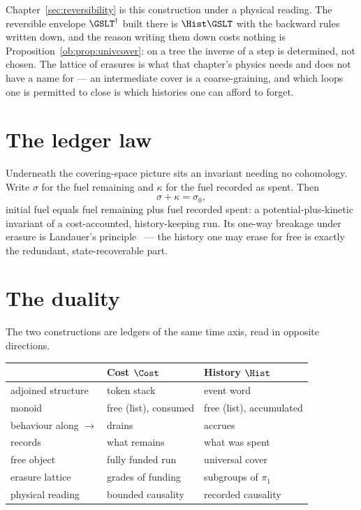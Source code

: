 \begin{remark}
\label{ob:rem:hist-forward}
Chapter~\ref{sec:reversibility} is this construction under a physical reading.
The reversible envelope $\GSLT^\dagger$ built there is $\Hist\GSLT$ with the
backward rules written down, and the reason writing them down costs nothing is
Proposition~\ref{ob:prop:univcover}: on a tree the inverse of a step is
determined, not chosen.
The lattice of erasures is what that chapter's physics needs and does not have a
name for --- an intermediate cover is a coarse-graining, and which loops one is
permitted to close is which histories one can afford to forget.
\end{remark}

\section{The ledger law}

Underneath the covering-space picture sits an invariant needing no cohomology. Write
$\sigma$ for the fuel remaining and $\kappa$ for the fuel recorded as spent. Then
\[
  \sigma + \kappa = \sigma_0 ,
\]
initial fuel equals fuel remaining plus fuel recorded spent: a potential-plus-kinetic
invariant of a cost-accounted, history-keeping run. Its one-way breakage under erasure is
Landauer's principle~\cite{Landauer} --- the history one may erase for free is exactly
the redundant, state-recoverable part.

\section{The duality}

The two constructions are ledgers of the same time axis, read in opposite directions.

\begin{center}
\begin{tabular}{@{}lll@{}}
\toprule
& \textbf{Cost $\Cost$} & \textbf{History $\Hist$} \\
\midrule
adjoined structure & token stack & event word \\
monoid             & free (list), consumed & free (list), accumulated \\
behaviour along $\longrightarrow$ & drains & accrues \\
records            & what remains & what was spent \\
free object        & fully funded run & universal cover \\
erasure lattice    & grades of funding & subgroups of $\pi_1$ \\
physical reading   & bounded causality & recorded causality \\
\bottomrule
\end{tabular}
\end{center}

